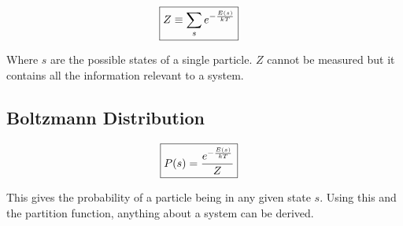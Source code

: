 \documentclass[10pt]{article}
\begin{document}
\begin{align}
  \Aboxed{Z\equiv \sum_{s}e^{-\frac{E(s)}{kT}}}
\end{align}

Where $s$ are the possible states of a single particle. $Z$ cannot be measured
but it contains all the information relevant to a system.

\subsection{Boltzmann Distribution}%
\label{sub:boltzmann_distribution}

\begin{align}
  \Aboxed{P(s)=\frac{e^{-\frac{E(s)}{kT}}}{Z}}
\end{align}

This gives the probability of a particle being in any given state $s$. Using
this and the partition function, anything about a system can be derived.
\end{document}
